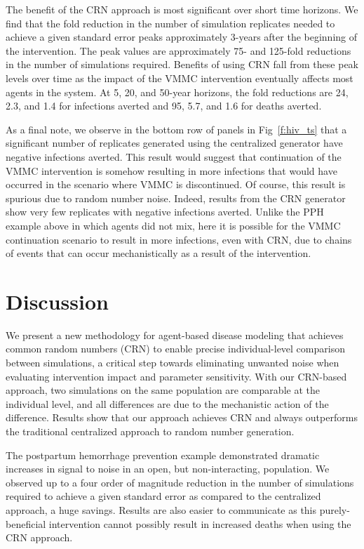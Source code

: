\documentclass[10pt,letterpaper]{article}
\begin{document}
The benefit of the CRN approach is most significant over short time horizons. We find that the fold reduction in the number of simulation replicates needed to achieve a given standard error peaks approximately 3-years after the beginning of the intervention. The peak values are approximately 75- and 125-fold reductions in the number of simulations required. Benefits of using CRN fall from these peak levels over time as the impact of the VMMC intervention eventually affects most agents in the system. At 5, 20, and 50-year horizons, the fold reductions are 24, 2.3, and 1.4 for infections averted and 95, 5.7, and 1.6 for deaths averted.

As a final note, we observe in the bottom row of panels in Fig~\ref{f:hiv_ts} that a significant number of replicates generated using the centralized generator have negative infections averted. This result would suggest that continuation of the VMMC intervention is somehow resulting in more infections that would have occurred in the scenario where VMMC is discontinued. Of course, this result is spurious due to random number noise. Indeed, results from the CRN generator show very few replicates with negative infections averted. Unlike the PPH example above in which agents did not mix, here it is possible for the VMMC continuation scenario to result in more infections, even with CRN, due to chains of events that can occur mechanistically as a result of the intervention. 


\section*{Discussion}\label{s:discussion}

We present a new methodology for agent-based disease modeling that achieves common random numbers (CRN) to enable precise individual-level comparison between simulations, a critical step towards eliminating unwanted noise when evaluating intervention impact and parameter sensitivity. With our CRN-based approach, two simulations on the same population are comparable at the individual level, and all differences are due to the mechanistic action of the difference. Results show that our approach achieves CRN and always outperforms the traditional centralized approach to random number generation.

The postpartum hemorrhage prevention example demonstrated dramatic increases in signal to noise in an open, but non-interacting, population. We observed up to a four order of magnitude reduction in the number of simulations required to achieve a given standard error as compared to the centralized approach, a huge savings. Results are also easier to communicate as this purely-beneficial intervention cannot possibly result in increased deaths when using the CRN approach.
\end{document}
